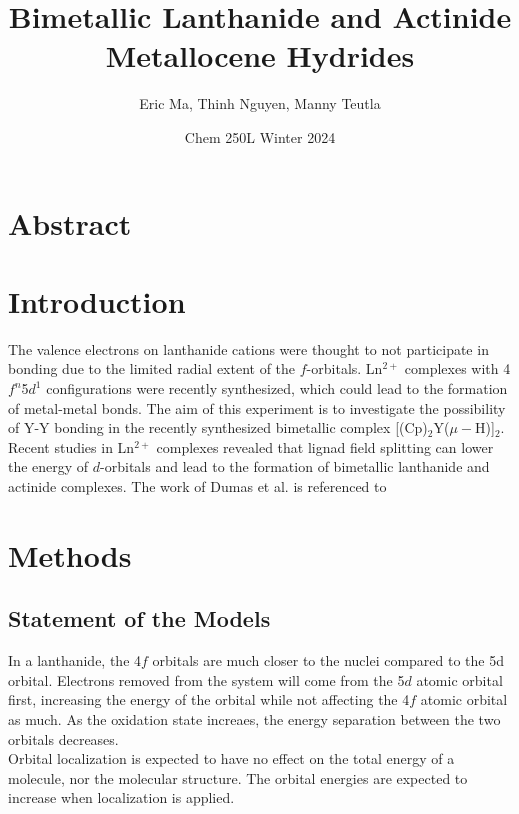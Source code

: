 \documentclass{article}
\title{Bimetallic Lanthanide and Actinide Metallocene Hydrides}
\author{Eric Ma, Thinh Nguyen, Manny Teutla}
\date{Chem 250L Winter 2024}
\begin{document}
\maketitle

\section{Abstract} %

\section{Introduction} %
The valence electrons on lanthanide cations were thought to not participate in
bonding due to the limited radial extent of the $f$-orbitals. Ln$^{2+}$
complexes with 4$f^n$5$d^1$ configurations were recently synthesized, which
could lead to the formation of metal-metal bonds. The aim of this experiment
is to investigate the possibility of Y-Y bonding in the recently synthesized
bimetallic complex [(Cp)$_2$Y($\mu - $H)]$_2$. \\
Recent studies in Ln$^{2+}$ complexes revealed that lignad field splitting can
lower the energy of $d$-orbitals and lead to the formation of bimetallic
lanthanide and actinide complexes. The work of Dumas et al. is referenced to


\section{Methods} %
\subsection{Statement of the Models} %
In a lanthanide, the 4$f$ orbitals are much closer to the nuclei compared to the
5d orbital. %
Electrons removed from the system will come from the 5$d$ atomic orbital first,
increasing the energy of the orbital while not affecting the 4$f$ atomic orbital
as much.  As the oxidation state increaes, the energy separation between the two
orbitals decreases. \\ Orbital localization is expected to have no effect on the
total energy of a molecule, nor the molecular structure.  The orbital energies
are expected to increase when localization is applied.
\end{document}
